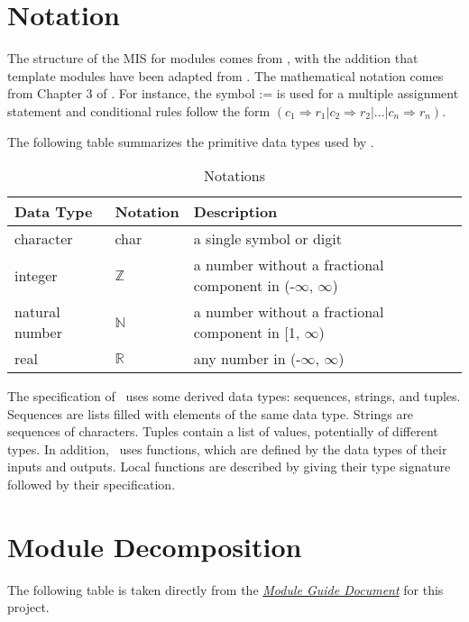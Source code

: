 \documentclass[12pt, titlepage]{article}
\begin{document}
\section{Notation}



The structure of the MIS for modules comes from \citet{HoffmanAndStrooper1995},
with the addition that template modules have been adapted from
\cite{GhezziEtAl2003}.  The mathematical notation comes from Chapter 3 of
\citet{HoffmanAndStrooper1995}.  For instance, the symbol := is used for a
multiple assignment statement and conditional rules follow the form $(c_1
\Rightarrow r_1 | c_2 \Rightarrow r_2 | ... | c_n \Rightarrow r_n )$.

\noindent The following table summarizes the primitive data types used by \progname. 


\renewcommand{\arraystretch}{1.2} 
\begin{table}[H]
\caption{Notations}
\centering
\begin{tabular}{l l p{7.5cm}} 
\toprule 
\textbf{Data Type} & \textbf{Notation} & \textbf{Description}\\ 
\midrule
character & char & a single symbol or digit\\
integer & $\mathbb{Z}$ & a number without a fractional component in (-$\infty$, $\infty$) \\
natural number & $\mathbb{N}$ & a number without a fractional component in [1, $\infty$) \\
real & $\mathbb{R}$ & any number in (-$\infty$, $\infty$)\\
\bottomrule
\end{tabular} 
\end{table}


\noindent
The specification of \progname \ uses some derived data types: sequences, strings, and
tuples. Sequences are lists filled with elements of the same data type. Strings
are sequences of characters. Tuples contain a list of values, potentially of
different types. In addition, \progname \ uses functions, which
are defined by the data types of their inputs and outputs. Local functions are
described by giving their type signature followed by their specification.

\section{Module Decomposition}

The following table is taken directly from the \href{https://github.com/jordanbierbrier/capstone/blob/main/docs/Design/SoftArchitecture/MG.pdf}{\textit{Module Guide Document}} for this project.
\end{document}
